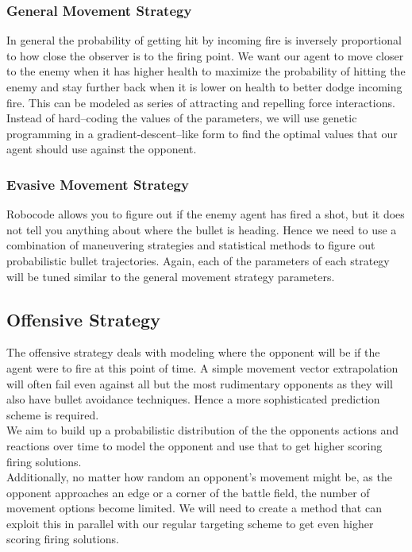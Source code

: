 \documentclass{article}
\theoremstyle{plain}
\theoremstyle{definition}
\theoremstyle{remark}
\begin{document}
\subsubsection*{General Movement Strategy}
In general the probability of getting hit by incoming fire is inversely proportional to how close the observer is to the firing point. We want our agent to move closer to the enemy when it has higher health to maximize the probability of hitting the enemy and stay further back when it is lower on health to better dodge incoming fire. This can be modeled as series of attracting and repelling force interactions. Instead of hard--coding the values of the parameters, we will use genetic programming in a gradient-descent--like form to find the optimal values that our agent should use against the opponent.

\subsubsection*{Evasive Movement Strategy}
Robocode allows you to figure out if the enemy agent has fired a shot, but it does not tell you anything about where the bullet is heading. Hence we need to use a combination of maneuvering strategies and statistical methods to figure out probabilistic bullet trajectories. Again, each of the parameters of each strategy will be tuned similar to the general movement strategy parameters.

\subsection*{Offensive Strategy}
The offensive strategy deals with modeling where the opponent will be if the agent were to fire at this point of time. A simple movement vector extrapolation will often fail even against all but the most rudimentary opponents as they will also have bullet avoidance techniques. Hence a more sophisticated prediction scheme is required.\\

We aim to build up a probabilistic distribution of the the opponents actions and reactions over time to model the opponent and use that to get higher scoring firing solutions.\\

Additionally, no matter how random an opponent's movement might be, as the opponent approaches an edge or a corner of the battle field, the number of movement options become limited. We will need to create a method that can exploit this in parallel with our regular targeting scheme to get even higher scoring firing solutions.
\end{document}
